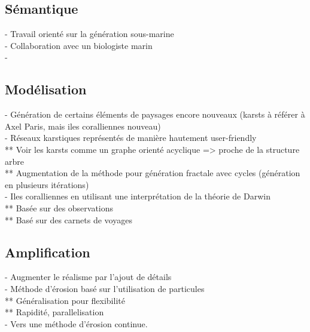 \subsection{Sémantique}
- Travail orienté sur la génération sous-marine \\
- Collaboration avec un biologiste marin \\
- 

\subsection{Modélisation}
- Génération de certains éléments de paysages encore nouveaux (karsts à référer à Axel Paris, mais iles coralliennes nouveau) \\
- Réseaux karstiques représentés de manière hautement user-friendly \\
** Voir les karsts comme un graphe orienté acyclique => proche de la structure arbre \\
** Augmentation de la méthode pour génération fractale avec cycles (génération en plusieurs itérations) \\
- Iles coralliennes en utilisant une interprétation de la théorie de Darwin \\
** Basée sur des observations \\
** Basé sur des carnets de voyages

\subsection{Amplification}
- Augmenter le réalisme par l'ajout de détails \\
- Méthode d'érosion basé sur l'utilisation de particules \\
** Généralisation pour flexibilité \\
** Rapidité, parallelisation \\
- Vers une méthode d'érosion continue.